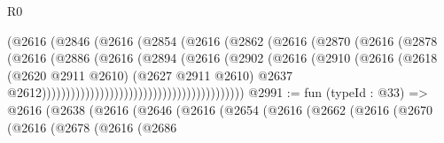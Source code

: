 \begin{lexlean}{R0}
\begin{coremodule}
                                                (@2616
                                                  (@2846
                                                    (@2616
                                                      (@2854
                                                        (@2616
                                                          (@2862
                                                            (@2616
                                                              (@2870
                                                                (@2616
                                                                  (@2878
                                                                    (@2616
                                                                      (@2886
                                                                        (@2616
                                                                          (@2894
                                                                            (@2616
                                                                              (@2902
                                                                                (@2616
                                                                                  (@2910
                                                                                    (@2616
                                                                                      (@2618
                                                                                        (@2620
                                                                                          @2911
                                                                                          @2610)
                                                                                        (@2627
                                                                                          @2911
                                                                                          @2610)
                                                                                        @2637
                                                                                        @2612))))))))))))))))))))))))))))))))))))))))))
@2991 := fun (typeId : @33) =>
  @2616
    (@2638
      (@2616
        (@2646
          (@2616
            (@2654
              (@2616
                (@2662
                  (@2616
                    (@2670
                      (@2616
                        (@2678
                          (@2616
                            (@2686

\end{coremodule}
\end{lexlean}
